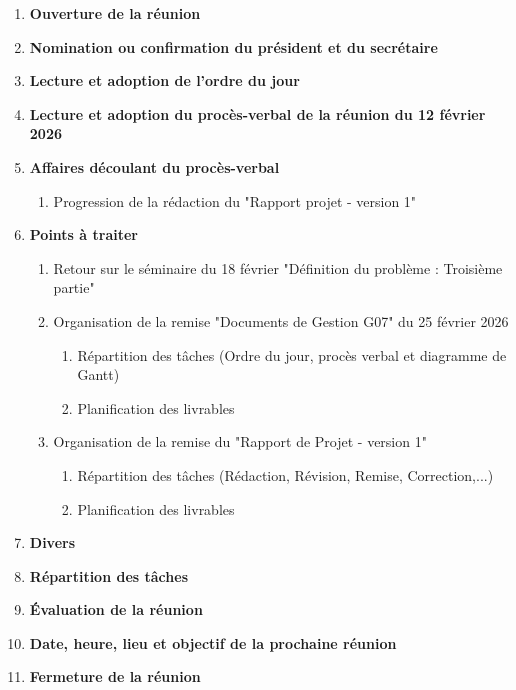 \documentclass[12pt]{ULojpv}
\begin{document}
\entete
\begin{enumerate}
   \item \textbf{Ouverture de la réunion}
   \item \textbf{Nomination ou confirmation du président et du secrétaire}
   \item \textbf{Lecture et adoption de l'ordre du jour}
   \item \textbf{Lecture et adoption du procès-verbal de la réunion du 12 février 2026}
   \item \textbf{Affaires découlant du procès-verbal}
      \begin{enumerate}
         \item Progression de la rédaction du "Rapport projet - version 1"    
      \end{enumerate}
   \item \textbf{Points à traiter}
      \begin{enumerate}
         \item Retour sur le séminaire du 18 février "Définition du problème : Troisième partie"
         \item Organisation de la remise "Documents de Gestion G07" du 25 février 2026
          \begin{enumerate}
               \item Répartition des tâches (Ordre du jour, procès verbal et diagramme de Gantt)
               \item Planification des livrables
            \end{enumerate}
        \item Organisation de la remise du "Rapport de Projet - version 1"  
        \begin{enumerate}
               \item Répartition des tâches (Rédaction, Révision, Remise, Correction,...)
               \item Planification des livrables
            \end{enumerate}
        
      \end{enumerate}
   \item \textbf{Divers}
   \item \textbf{Répartition des tâches}
   \item \textbf{Évaluation de la réunion}
   \item \textbf{Date, heure, lieu et objectif de la prochaine réunion}
   \item \textbf{Fermeture de la réunion}
\end{enumerate}
\end{document}
